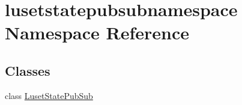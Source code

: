 \hypertarget{namespacelusetstatepubsubnamespace}{}\section{lusetstatepubsubnamespace Namespace Reference}
\label{namespacelusetstatepubsubnamespace}
\subsection*{Classes}
\begin{DoxyCompactItemize}
\item 
class \hyperlink{classlusetstatepubsubnamespace_1_1LusetStatePubSub}{Luset\+State\+Pub\+Sub}
\end{DoxyCompactItemize}

